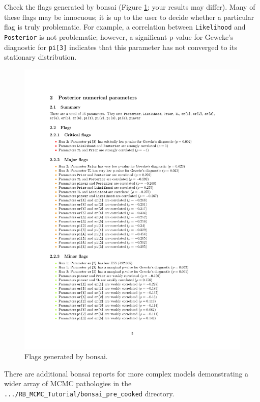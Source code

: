 \documentclass[11pt]{article}
\begin{document}
Check the flags generated by bonsai (Figure \ref{fig:flags}; your results may differ). 
Many of these flags may be innocuous; it is up to the user to decide whether a particular flag is truly problematic.
For example, a correlation between \texttt{Likelihood} and \texttt{Posterior} is not problematic; however, a significant p-value for Geweke's diagnostic for \texttt{pi[3]} indicates that this parameter has not converged to its stationary distribution.

\begin{figure}[h!]
\begin{center}
\includegraphics[]{./figures/flags.pdf}
\end{center}
\caption{Flags generated by bonsai.}\label{fig:flags}
\end{figure}

There are additional bonsai reports for more complex models demonstrating a wider array of MCMC pathologies in the \verb!.../RB_MCMC_Tutorial/bonsai_pre_cooked! directory.
\end{document}

